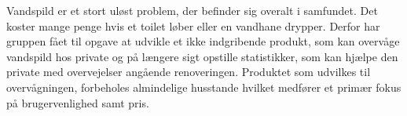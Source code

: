 Vandspild er et stort uløst problem, der befinder sig overalt i samfundet. Det koster mange penge hvis et toilet løber eller en vandhane drypper. Derfor har gruppen fået til opgave at udvikle et ikke indgribende produkt, som kan overvåge vandspild hos private og på længere sigt opstille statistikker, som kan hjælpe den private med overvejelser angående renoveringen. Produktet som udvilkes til overvågningen, forbeholes almindelige husstande hvilket medfører et primær fokus på brugervenlighed samt pris.\newline


